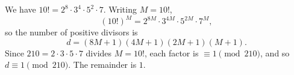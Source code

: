 We have $10!=2^8\cdot3^4\cdot5^2\cdot7$. Writing $M=10!$,
\[(10!)^{M}=2^{8M}\cdot3^{4M}\cdot5^{2M}\cdot7^{M},\]
so the number of positive divisors is
\[d=(8M+1)(4M+1)(2M+1)(M+1).\]
Since $210=2\cdot3\cdot5\cdot7$ divides $M=10!$, each factor is $\equiv1\pmod{210}$, and so $d\equiv1\pmod{210}$. The remainder is $\boxed{1}$.
